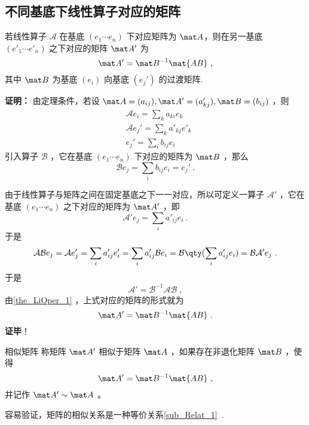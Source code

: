 \subsection{不同基底下线性算子对应的矩阵}\label{sub_LiOper_1}
\begin{theorem}{}\label{the_LiOper_2}
若线性算子 $\mathcal A$ 在基底 $( e_1\cdots  e_n)$ 下对应矩阵为 $\mat A$，则在另一基底  $( e'_1\cdots  e'_n)$ 之下对应的矩阵 $\mat A'$ 为
\begin{equation}
\mat A'=\mat B^{-1}\mat{AB}~,
\end{equation}
其中 $\mat B$ 为基底 $( e_i)$ 向基底 $( e_j')$ 的过渡矩阵.
\end{theorem}
\textbf{证明：}
由定理条件，若设 $\mat A=(a_{ij}), \mat A'=(a_{kj}'),\mat B=(b_{ij})$ ，则
\begin{equation}
\begin{aligned}
&\mathcal{A} e_i=\sum_{k} a_{ki} e_k
\\
&\mathcal{A} e_j'=\sum_{k} a'_{kj} e'_k\\
& e_j'=\sum_i b_{ij} e_i
\end{aligned}
\end{equation}
引入算子 $\mathcal{B}$ ，它在基底 $( e_1\cdots  e_n)$ 下对应的矩阵为 $\mat B$ ，那么
\begin{equation}
\mathcal{B} e_j=\sum_i b_{ij} e_i= e_j'~.
\end{equation}

由于线性算子与矩阵之间在固定基底之下一一对应，所以可定义一算子 $\mathcal{A'}$ ，它在基底 $( e_1\cdots  e_n)$ 之下对应的矩阵为 $\mat A'$ ，即
\begin{equation}
\mathcal A' e_j=\sum_i a'_{ij} e_i~.
\end{equation}
于是
\begin{equation}
\mathcal{AB} e_j=\mathcal{A} e'_j=\sum_i a'_{ij}  e'_i=\sum_i a'_{ij}\mathcal{B} e_i=\mathcal{B}\qty(\sum_i a'_{ij} e_i)=\mathcal{BA'} e_j~.
\end{equation}
于是 
\begin{equation}
\mathcal{A'}=\mathcal{B}^{-1}\mathcal{AB}~,
\end{equation}
由\autoref{the_LiOper_1} ，上式对应的矩阵的形式就为
\begin{equation}
\mat A'=\mat B^{-1}\mat{AB}~.
\end{equation}
\textbf{证毕}！
\begin{definition}{相似矩阵}
称矩阵 $\mat A'$ 相似于矩阵 $\mat A$ ，如果存在非退化矩阵 $\mat B$ ，使得
\begin{equation}
\mat A'=\mat B^{-1}\mat{AB}~,
\end{equation}
并记作 $\mat A'\sim \mat A$ 。
\end{definition}
容易验证，矩阵的相似关系是一种等价关系\autoref{sub_Relat_1}~.

